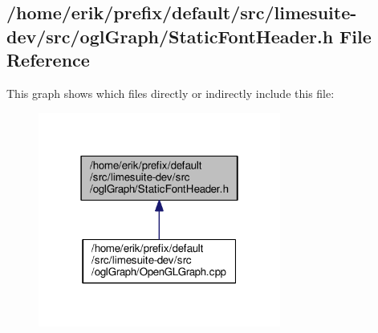 \subsection{/home/erik/prefix/default/src/limesuite-\/dev/src/ogl\+Graph/\+Static\+Font\+Header.h File Reference}
\label{StaticFontHeader_8h}
This graph shows which files directly or indirectly include this file\+:
\nopagebreak
\begin{figure}[H]
\begin{center}
\leavevmode
\includegraphics[width=226pt]{d6/d6c/StaticFontHeader_8h__dep__incl}
\end{center}
\end{figure}
